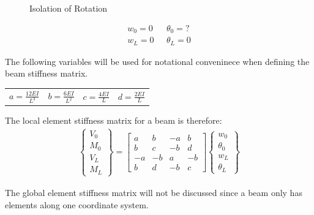 \begin{figure}[h]
\begin{center}
\caption{Isolation of Rotation}
\end{center}
\end{figure}


\begin{align*}
	w_0=0 & \text{	} \theta_0=?\\
	w_L=0 &\text{	}  \theta_L=0
\end{align*}

The following variables will be used for notational conveninece when defining the beam stiffness matrix.

\begin{center}
	\begin{tabular}{cccc}
		$a=\frac{12EI}{L^3}$ & $b=\frac{6EI}{L^2}$ & $c=\frac{4EI}{L}$ & $d=\frac{2EI}{L}$
	\end{tabular}
\end{center}

The local element stiffness matrix for a beam is therefore:
\begin{align}
	\begin{Bmatrix}
		V_0\\ M_0\\ \hline V_L\\ M_L
	\end{Bmatrix}
	=
	\left[
	\begin{array}{cc|cc}
		a & b & -a & b\\
		b & c & -b & d\\ \hline
		-a & -b & a & -b\\
		b & d & -b & c
	\end{array}
	\right]
	\begin{Bmatrix}
		w_0\\ \theta_0\\ \hline w_L\\ \theta_L
	\end{Bmatrix}
\end{align}

The global element stiffness matrix will not be discussed since a beam only has elements along one coordinate system. 